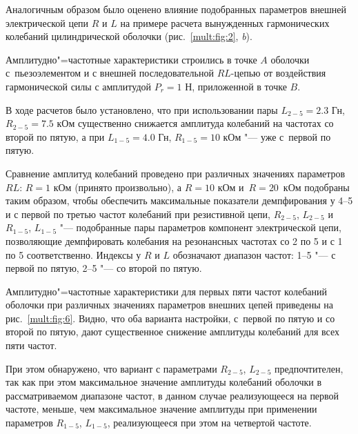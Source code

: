 Аналогичным образом было оценено влияние подобранных параметров внешней электрической цепи $R$ и $L$ на примере расчета вынужденных гармонических колебаний цилиндрической оболочки (рис.~\ref{mult:fig:2}, {\sl b}).



Амплитудно"=частотные характеристики строились в точке $A$ оболочки с~пьезоэлементом и с внешней последовательной $RL$-цепью от воздействия гармонической силы с амплитудой $P_{r}=1$ Н, приложенной в точке $B$.



В ходе расчетов было установлено, что при использовании пары $L_{2-5}=2.3$ Гн, $R_{2-5}=7.5$ кОм существенно снижается амплитуда колебаний на частотах со второй по пятую, а при $L_{1-5}=4.0$ Гн, $R_{1-5}=10$ кОм "--- уже с~первой по пятую.



Сравнение амплитуд колебаний проведено при различных значениях параметров $RL$: $R=1$ кОм (принято произвольно), а $R=10$ кОм и~${R=20}$~кОм подобраны таким образом, чтобы обеспечить максимальные показатели демпфирования у 4--5 и с первой по третью частот колебаний при резистивной цепи, $R_{2-5}$, $L_{2-5}$ и $R_{1-5}$, $L_{1-5}$ "--- подобранные пары параметров компонент электрической цепи, позволяющие демпфировать колебания на резонансных частотах со 2 по 5 и с 1 по 5 соответственно. Индексы у $R$ и $L$ обозначают диапазон частот: 1--5 "--- с первой по пятую, 2--5 "--- со второй по пятую.

Амплитудно"=частотные характеристики для первых пяти частот колебаний оболочки при различных значениях параметров внешних цепей приведены на рис.~\ref{mult:fig:6}. Видно, что оба варианта настройки, с~первой по пятую и со второй по пятую, дают существенное снижение амплитуды колебаний для всех пяти частот.







При этом обнаружено, что вариант с параметрами $R_{2-5}$, $L_{2-5}$ предпочтителен, так как при этом максимальное значение амплитуды колебаний оболочки в рассматриваемом диапазоне частот, в данном случае реализующееся на первой частоте, меньше, чем максимальное значение амплитуды при применении параметров $R_{1-5}$, $L_{1-5}$,  реализующееся при этом на четвертой частоте.



\smallskip




